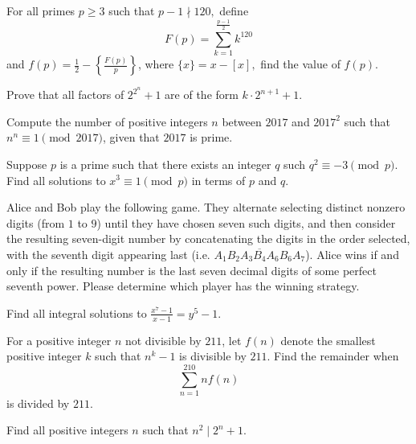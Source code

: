 \documentclass{article}
\begin{document}
\begin{req}{3}
For all primes $p \geq 3$ such that $p-1 \nmid 120,$ define $$F(p) = \sum^{\frac{p-1}{2}}_{k=1}k^{120}$$ and $f(p) = \frac{1}{2} - \left\{ \frac{F(p)}{p} \right\}$, where $\{x\} = x - [x],$ find the value of $f(p).$
\end{req}

\begin{prob}[Euler]{3}
Prove that all factors of $2^{2^{n}} + 1$ are of the form $k \cdot 2^{n+1} + 1.$
\end{prob}

\begin{prob}{3}
Compute the number of positive integers $n$ between $2017$ and $2017^2$ such that $n^n \equiv 1\pmod{2017}$, given that $2017$ is prime.
\end{prob}

\begin{req}[]{4}
Suppose $p$ is a prime such that there exists an integer $q$ such $q^2 \equiv -3 \pmod{p}.$ Find all solutions to $x^3 \equiv 1 \pmod{p}$ in terms of $p$ and $q.$
\end{req}

\begin{prob}{6}
Alice and Bob play the following game. They alternate selecting distinct nonzero digits (from $1$ to $9$) until they have chosen seven such digits, and then consider the resulting seven-digit number by concatenating the digits in the order selected, with the seventh digit appearing last (i.e. $\overline{A_1B_2A_3B_4A_6B_6A_7}$). Alice wins if and only if the resulting number is the last seven decimal digits of some perfect seventh power. Please determine which player has the winning strategy.
\end{prob}

\begin{prob}[ISL 2006/N5]{6}
Find all integral solutions to $\frac {x^{7} - 1}{x - 1} = y^{5} - 1.$
\end{prob}

\begin{prob}[DIME 2020/14]{6}
For a positive integer $n$ not divisible by $211$, let $f(n)$ denote the smallest positive integer $k$ such that $n^k - 1$ is divisible by $211$. Find the remainder when $$\sum_{n=1}^{210} nf(n)$$ is divided by $211$.
\end{prob}

\begin{prob}{9}
Find all positive integers $n$ such that $n^2 \mid 2^n+1.$
\end{prob}
\end{document}
